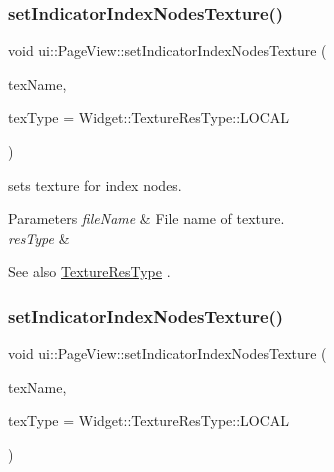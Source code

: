 \subsubsection{\texorpdfstring{set\+Indicator\+Index\+Nodes\+Texture()}{setIndicatorIndexNodesTexture()}\hspace{0.1cm}{\footnotesize\ttfamily [1/2]}}
{\footnotesize\ttfamily void ui\+::\+Page\+View\+::set\+Indicator\+Index\+Nodes\+Texture (\begin{DoxyParamCaption}\item[{const std\+::string \&}]{tex\+Name,  }\item[{\hyperlink{classui_1_1Widget_a040a65ec5ad3b11119b7e16b98bd9af0}{Widget\+::\+Texture\+Res\+Type}}]{tex\+Type = {\ttfamily Widget\+:\+:TextureResType\+:\+:LOCAL} }\end{DoxyParamCaption})}

sets texture for index nodes.


\begin{DoxyParams}{Parameters}
{\em file\+Name} & File name of texture. \\
\hline
{\em res\+Type} & \\
\hline
\end{DoxyParams}
\begin{DoxySeeAlso}{See also}
\hyperlink{classui_1_1Widget_a040a65ec5ad3b11119b7e16b98bd9af0}{Texture\+Res\+Type} . 
\end{DoxySeeAlso}
\mbox{\label{classui_1_1PageView_a1413a09228d8aa99d44afbd77b9354e4}} 
\subsubsection{\texorpdfstring{set\+Indicator\+Index\+Nodes\+Texture()}{setIndicatorIndexNodesTexture()}\hspace{0.1cm}{\footnotesize\ttfamily [2/2]}}
{\footnotesize\ttfamily void ui\+::\+Page\+View\+::set\+Indicator\+Index\+Nodes\+Texture (\begin{DoxyParamCaption}\item[{const std\+::string \&}]{tex\+Name,  }\item[{\hyperlink{classui_1_1Widget_a040a65ec5ad3b11119b7e16b98bd9af0}{Widget\+::\+Texture\+Res\+Type}}]{tex\+Type = {\ttfamily Widget\+:\+:TextureResType\+:\+:LOCAL} }\end{DoxyParamCaption})}

